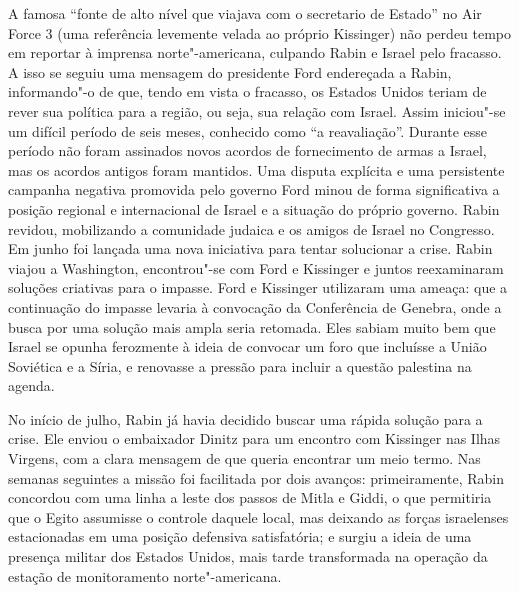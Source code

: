 A famosa ``fonte de alto nível que viajava com o secretario de Estado'' no Air Force 3 
(uma referência levemente velada ao próprio Kissinger)
não perdeu tempo em reportar à imprensa norte"-americana, culpando Rabin
e Israel pelo fracasso. A isso se seguiu uma mensagem do presidente Ford
endereçada a Rabin, informando"-o de que, tendo em vista o fracasso, os
Estados Unidos teriam de rever sua política para a região, ou seja, sua
relação com Israel. Assim iniciou"-se um difícil período de seis meses,
conhecido como ``a reavaliação''. Durante esse período não foram
assinados novos acordos de fornecimento de armas a Israel, mas os
acordos antigos foram mantidos. Uma disputa explícita e uma persistente
campanha negativa promovida pelo governo Ford minou de forma
significativa a posição regional e internacional de Israel e a situação
do próprio governo. Rabin revidou, mobilizando a comunidade judaica e os
amigos de Israel no Congresso. Em junho foi lançada uma nova iniciativa
para tentar solucionar a crise. Rabin viajou a Washington, encontrou"-se
com Ford e Kissinger e juntos reexaminaram soluções criativas para o
impasse. Ford e Kissinger utilizaram uma ameaça: que a continuação do
impasse levaria à convocação da Conferência de Genebra, onde a busca por
uma solução mais ampla seria retomada. Eles sabiam muito bem que Israel
se opunha ferozmente à ideia de convocar um foro que incluísse a União
Soviética e a Síria, e renovasse a pressão para incluir a questão
palestina na agenda.

No início de julho, Rabin já havia decidido buscar uma rápida solução
para a crise. Ele enviou o embaixador Dinitz para um encontro com
Kissinger nas Ilhas Virgens, com a clara mensagem de que queria
encontrar um meio termo. Nas semanas seguintes a missão foi facilitada
por dois avanços: primeiramente, Rabin concordou com uma linha a leste
dos passos de Mitla e Giddi, o que permitiria que o Egito assumisse o
controle daquele local, mas deixando as forças israelenses estacionadas em
uma posição defensiva satisfatória; e surgiu a ideia de uma presença
militar dos Estados Unidos, mais tarde transformada na operação da estação
de monitoramento norte"-americana.


